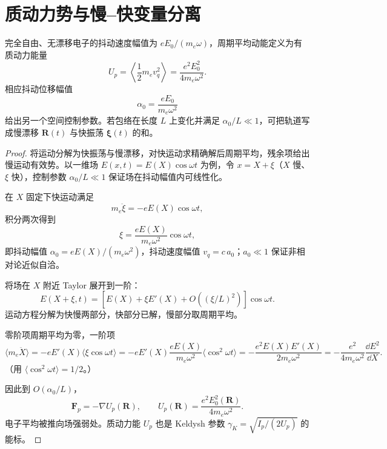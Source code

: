 \section{质动力势与慢--快变量分离}

完全自由、无漂移电子的抖动速度幅值为 $eE_0/(m_e\omega)$，周期平均动能定义为有质动力能量
\begin{equation}
U_p=\left\langle\frac12m_ev_q^2\right\rangle
=\frac{e^2E_0^2}{4m_e\omega^2}.
\label{eq:ponderomotive-energy}
\end{equation}
相应抖动位移幅值
\begin{equation}
\alpha_0=\frac{eE_0}{m_e\omega^2}
\label{eq:quiver-amplitude}
\end{equation}
给出另一个空间控制参数。若包络在长度 $L$ 上变化并满足 $\alpha_0/L\ll1$，可把轨道写成慢漂移 $\mathbf R(t)$ 与快振荡 $\boldsymbol\xi(t)$ 的和。

\begin{proof}
将运动分解为快振荡与慢漂移，对快运动求精确解后周期平均，残余项给出慢运动有效势。以一维场 $E(x,t)=E(X)\cos\omega t$ 为例，令 $x=X+\xi$（$X$ 慢、$\xi$ 快），控制参数 $\alpha_0/L\ll1$ 保证场在抖动幅值内可线性化。

在 $X$ 固定下快运动满足
\begin{equation*}
 m_e\ddot\xi=-eE(X)\cos\omega t,
\end{equation*}
积分两次得到
\begin{equation*}
 \xi=\frac{eE(X)}{m_e\omega^2}\cos\omega t,
\end{equation*}
即抖动幅值 $\alpha_0=eE(X)/(m_e\omega^2)$，抖动速度幅值 $v_q=c\,a_0$；$a_0\ll1$ 保证非相对论近似自洽。

将场在 $X$ 附近 Taylor 展开到一阶：
\begin{equation*}
 E(X+\xi,t)
 =\left[E(X)+\xi E'(X)+O((\xi/L)^2)\right]\cos\omega t.
\end{equation*}
运动方程分解为快慢两部分，快部分已解，慢部分取周期平均。

零阶项周期平均为零，一阶项
\begin{equation*}
 \langle m_e\ddot X\rangle
 =-eE'(X)\langle\xi\cos\omega t\rangle
 =-eE'(X)\frac{eE(X)}{m_e\omega^2}\langle\cos^2\omega t\rangle
 =-\frac{e^2E(X)E'(X)}{2m_e\omega^2}
 =-\frac{e^2}{4m_e\omega^2}\frac{\dd E^2}{\dd X}.
\end{equation*}
（用 $\langle\cos^2\omega t\rangle=1/2$。）

因此到 $O(\alpha_0/L)$，
\begin{equation}\label{eq:ponderomotive-force}
 \mathbf F_p=-\nabla U_p(\mathbf R),
 \qquad
 U_p(\mathbf R)=\frac{e^2E_0^2(\mathbf R)}{4m_e\omega^2}.
\end{equation}
电子平均被推向场强弱处。质动力能 $U_p$ 也是 Keldysh 参数 $\gamma_K=\sqrt{I_p/(2U_p)}$ 的能标。
\end{proof}

